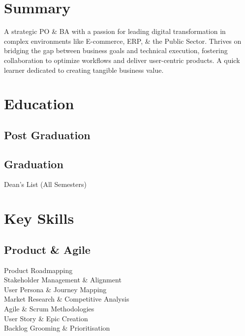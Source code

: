 \documentclass[]{deedy-resume-reversed}
\begin{document}
\begin{minipage}[t]{0.33\textwidth}


\section{Summary}

A strategic PO \& BA with a passion for leading digital transformation in complex environments like E-commerce, ERP, \& the Public Sector. Thrives on bridging the gap between business goals and technical execution, fostering collaboration to optimize workflows and deliver user-centric products. A quick learner dedicated to creating tangible business value.
\sectionsep

\section{Education}

\subsection{Post Graduation}
\sectionsep


\subsection{Graduation}
Dean's List (All Semesters) \\
\sectionsep



\section{Key Skills}

\subsection{Product \& Agile}
Product Roadmapping\\
Stakeholder Management \& Alignment\\
User Persona \& Journey Mapping\\
Market Research \& Competitive Analysis\\
Agile \& Scrum Methodologies\\
User Story \& Epic Creation\\
Backlog Grooming \& Prioritisation\\


\end{minipage}
\end{document}
